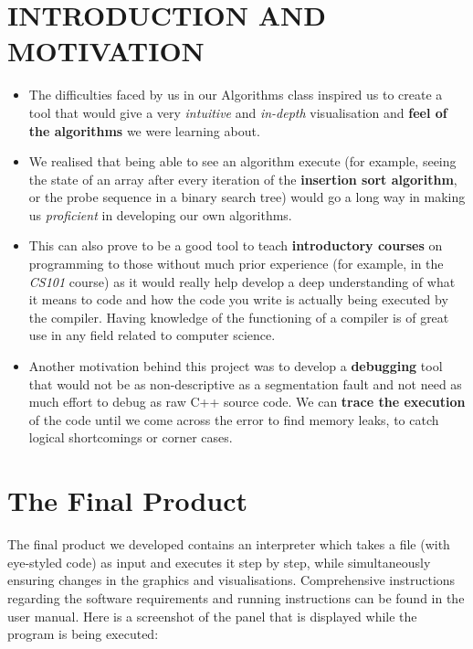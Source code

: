 \documentclass{article}
\begin{document}
\section{INTRODUCTION AND MOTIVATION} 
\begin{itemize}
\item The difficulties faced by us in our Algorithms class inspired us to create a tool that would give a very \textit {intuitive} and \textit {in-depth} visualisation and {\bf feel of the algorithms} we were learning about. 

\item We realised that being able to see an algorithm execute (for example, seeing the state of an array after every iteration of the {\bf insertion sort algorithm}, or the probe sequence in a binary search tree) would go a long way in making us \textit {proficient} in developing our own algorithms. 

\item This can also prove to be a good tool to teach {\bf introductory courses} on programming to those without much prior experience (for example, in the \textit {CS101} course) as it would really help develop a deep understanding of what it means to code and how the code you write is actually being executed by the compiler. Having knowledge of the functioning of a compiler is of great use in any field related to computer science. 

\item Another motivation behind this project was to develop a {\bf debugging} tool that would not be as non-descriptive as a segmentation fault and not need as much effort to debug as raw C++ source code. We can {\bf trace the execution} of the code until we come across the error to find memory leaks, to catch logical shortcomings or corner cases. 
\end{itemize}

\section{The Final Product}
The final product we developed contains an interpreter which takes a file (with eye-styled code) as input and executes it step by step, while simultaneously ensuring changes in the graphics and visualisations. Comprehensive instructions regarding the software requirements and running instructions can be found in the user manual. Here is a screenshot of the panel that is displayed while the program is being executed:
\end{document}
